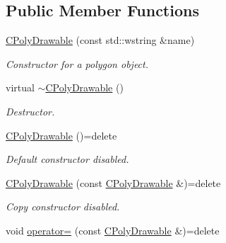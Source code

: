 \subsection*{Public Member Functions}
\begin{DoxyCompactItemize}
\item 
\hyperlink{class_c_poly_drawable_a0afc2421a1a15fa7065423ccbe6d6ecc}{C\+Poly\+Drawable} (const std\+::wstring \&name)
\begin{DoxyCompactList}\small\item\em Constructor for a polygon object. \end{DoxyCompactList}\item 
\hypertarget{class_c_poly_drawable_afc766fdf8f37312434063b3b615f410b}{virtual \hyperlink{class_c_poly_drawable_afc766fdf8f37312434063b3b615f410b}{$\sim$\+C\+Poly\+Drawable} ()}\label{class_c_poly_drawable_afc766fdf8f37312434063b3b615f410b}

\begin{DoxyCompactList}\small\item\em Destructor. \end{DoxyCompactList}\item 
\hypertarget{class_c_poly_drawable_ae4265afa898200aa70a943cdea3f8123}{\hyperlink{class_c_poly_drawable_ae4265afa898200aa70a943cdea3f8123}{C\+Poly\+Drawable} ()=delete}\label{class_c_poly_drawable_ae4265afa898200aa70a943cdea3f8123}

\begin{DoxyCompactList}\small\item\em Default constructor disabled. \end{DoxyCompactList}\item 
\hypertarget{class_c_poly_drawable_abfdd10484ab2cb6ea99c01849cad4082}{\hyperlink{class_c_poly_drawable_abfdd10484ab2cb6ea99c01849cad4082}{C\+Poly\+Drawable} (const \hyperlink{class_c_poly_drawable}{C\+Poly\+Drawable} \&)=delete}\label{class_c_poly_drawable_abfdd10484ab2cb6ea99c01849cad4082}

\begin{DoxyCompactList}\small\item\em Copy constructor disabled. \end{DoxyCompactList}\item 
\hypertarget{class_c_poly_drawable_a86a6c65081b7feb556e5563b36a6ac8a}{void \hyperlink{class_c_poly_drawable_a86a6c65081b7feb556e5563b36a6ac8a}{operator=} (const \hyperlink{class_c_poly_drawable}{C\+Poly\+Drawable} \&)=delete}\label{class_c_poly_drawable_a86a6c65081b7feb556e5563b36a6ac8a}


\end{DoxyCompactItemize}
